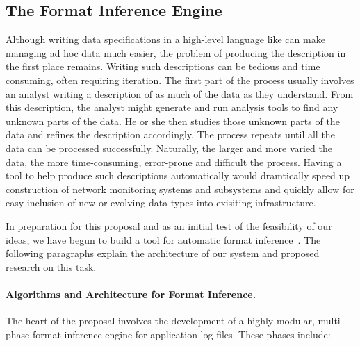 \subsection{The Format Inference Engine}
\label{sec:inference}

Although writing data specifications in a high-level language like
\pads{} can make managing ad hoc data much easier,
the problem of producing the description in the first place
remains. Writing such descriptions can be tedious and time consuming,
often requiring iteration. The first part of the process usually
involves an analyst writing a description of as
much of the data as they understand. From this description, the analyst
might generate and run analysis tools to find any unknown parts of the
data. He or she then studies those unknown parts of the data and refines the description
accordingly.   The process repeats until all the data can be processed successfully.
Naturally, the larger and more varied the data, the more time-consuming,
error-prone and difficult the process.  Having a tool to help produce such 
descriptions automatically would dramtically speed up construction of
network monitoring systems and subsystems and quickly allow for easy inclusion of
new or evolving data types into exisiting infrastructure.






In preparation for this proposal and as an initial test of the
feasibility of our ideas, we have begun to build a tool for automatic
format inference~\cite{Fisher+:dirttoshovels}.  The following paragraphs explain the architecture
of our system and proposed research on this task.

\paragraph*{Algorithms and Architecture for Format Inference.}
The heart of the proposal involves the development of a highly modular, multi-phase
format inference engine for application log files.  These phases include:

